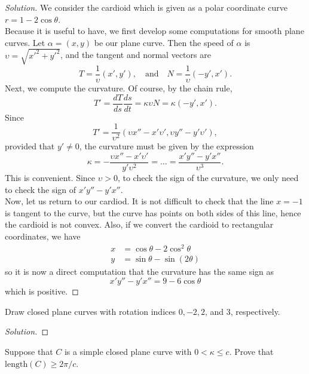\documentclass[Shifrin_Solutions_Spring_2015]{subfiles}
\begin{document}
\begin{proof}[Solution] We consider the cardioid which is given as a polar coordinate curve $r = 1-2\cos \theta$.\\


Because it is useful to have, we first develop some computations for smooth plane curves.  Let $\alpha = (x,y)$ be our plane curve. Then the speed of $\alpha$ is $\upsilon = \sqrt{x'^2 +y'^2}$, and  the tangent and normal vectors are
\[
T  = \dfrac{1}{\upsilon}\left( x', y' \right) , \quad\mbox{and} \quad N = \dfrac{1}{\upsilon}\left(-y', x'\right).
\]
Next, we compute the curvature. Of course, by the chain rule,
\[
T' = \dfrac{dT}{ds}\dfrac{ds}{dt} = \kappa \upsilon N = \kappa \left( -y', x'\right) .
\]
Since
\[
T' = \dfrac{1}{\upsilon^2} \left( \upsilon x'' - x' \upsilon' , \upsilon y'' - y'\upsilon' \right),
\]
provided that $y' \neq 0$, the curvature must be given by the expression
\[
\kappa = -  \dfrac{\upsilon x'' - x' \upsilon'}{y'\upsilon^2} = \dots =\dfrac{x'y'' - y'x''}{\upsilon^3} .
\]
This is convenient. Since $\upsilon>0$, to check the sign of the curvature, we only need to check the sign of $x'y'' - y'x''$.\\

Now, let us return to our cardiod. It is not difficult to check that the line $x=-1$ is tangent to the curve, but the curve has points on both sides of this line, hence the cardioid is not convex. Also, if we convert the cardioid to rectangular coordinates, we have
\begin{align*}
x &= \cos \theta - 2\cos^2\theta \\
y& = \sin\theta - \sin(2\theta)
\end{align*}
so it is now a direct computation that the curvature has the same sign as
\[
x'y''-y'x''  = 9-6\cos\theta
\]
which is positive.
\end{proof}


\begin{exercise} Draw closed plane curves with rotation indices $0, -2, 2$, and $3$, respectively.
\end{exercise}

\begin{proof}[Solution]
\end{proof}


\begin{exercise} Suppose that $C$ is a simple closed plane curve with $0 < \kappa \leq c$. Prove that $\mathrm{length}(C) \geq 2\pi / c$.
\end{exercise}
\end{document}
